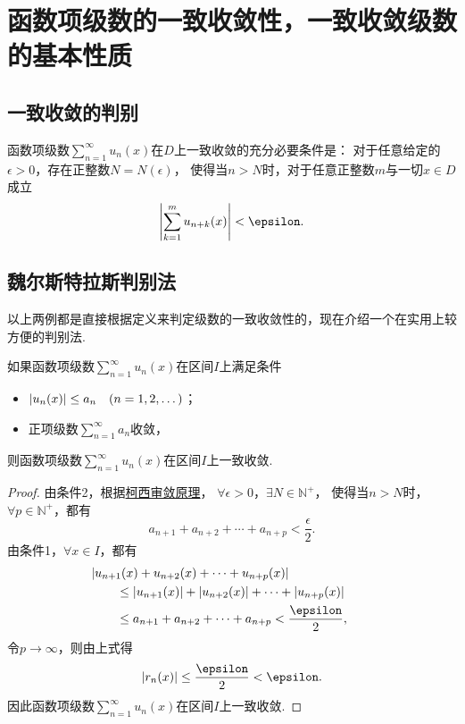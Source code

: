 \section{函数项级数的一致收敛性，一致收敛级数的基本性质}

\subsection{一致收敛的判别}
\begin{theorem}
函数项级数\(\sum_{n=1}^\infty u_n(x)\)在\(D\)上一致收敛的充分必要条件是：
对于任意给定的\(\epsilon>0\)，存在正整数\(N = N(\epsilon)\)，
使得当\(n>N\)时，对于任意正整数\(m\)与一切\(x \in D\)成立
\[
	\abs{\sum_{k=1}^m u_{n+k}(x)} < \epsilon.
\]
\end{theorem}

\subsection{魏尔斯特拉斯判别法}
以上两例都是直接根据定义来判定级数的一致收敛性的，现在介绍一个在实用上较方便的判别法.
\begin{theorem}[魏尔斯特拉斯判别法]\label{theorem:无穷级数.魏尔斯特拉斯判别法}
如果函数项级数\(\sum_{n=1}^\infty u_n(x)\)在区间\(I\)上满足条件\begin{itemize}
	\item \(\abs{u_n(x)} \leq a_n \quad(n=1,2,\dotsc)\)；
	\item 正项级数\(\sum_{n=1}^\infty a_n\)收敛，
\end{itemize}
则函数项级数\(\sum_{n=1}^\infty u_n(x)\)在区间\(I\)上一致收敛.
\begin{proof}
由条件2，根据\hyperref[theorem:无穷级数.级数的柯西审敛原理]{柯西审敛原理}，
\(\forall\epsilon>0\)，\(\exists N \in \mathbb{N}^+\)，
使得当\(n > N\)时，\(\forall p \in \mathbb{N}^+\)，都有\[
	a_{n+1} + a_{n+2} + \dotsb + a_{n+p} < \frac{\epsilon}{2}.
\]
由条件1，\(\forall x \in I\)，都有\begin{align*}
	&\hspace{-20pt}\abs{u_{n+1}(x) + u_{n+2}(x) + \dotsb + u_{n+p}(x)} \\
	&\leq \abs{u_{n+1}(x)} + \abs{u_{n+2}(x)} + \dotsb + \abs{u_{n+p}(x)} \\
	&\leq a_{n+1} + a_{n+2} + \dotsb + a_{n+p} < \frac{\epsilon}{2},
\end{align*}
令\(p\to\infty\)，则由上式得\[
	\abs{r_n(x)} \leq \frac{\epsilon}{2} < \epsilon.
\]
因此函数项级数\(\sum_{n=1}^\infty u_n(x)\)在区间\(I\)上一致收敛.
\end{proof}
\end{theorem}

